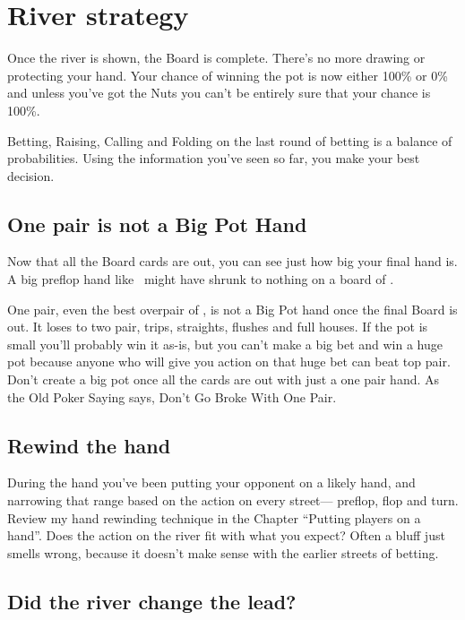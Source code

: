 \chapter{River strategy}


Once the river is shown, the Board is complete. There's no more
drawing or protecting your hand. Your chance of winning the pot
is now either 100\% or 0\% and unless you've got the Nuts you
can't be entirely sure that your chance is 100\%.

Betting, Raising, Calling and Folding on the last round of betting
is a balance of probabilities. Using the information you've seen
so far, you make your best decision.

\section{One pair is not a Big Pot Hand}

Now that all the Board cards are out, you can see just how big
your final hand is. A big preflop hand like \Ah\Kh\ might have
shrunk to nothing on a board of \Jc\eigh\fivec\ninec\tenc.

One pair, even the best overpair of \Ah\As, is not a Big Pot hand once
the final Board is out. It loses to two pair, trips, straights,
flushes and full houses. If the pot is small you'll probably win it
as-is, but you can't make a big bet and win a huge pot because anyone
who will give you action on that huge bet can beat top pair. Don't
create a big pot once all the cards are out with just a one pair
hand. As the Old Poker Saying says, Don't Go Broke With One Pair.

\section{Rewind the hand}

During the hand you've been putting your opponent on a likely
hand, and narrowing that range based on the action on every street---
preflop, flop and turn. Review my hand rewinding technique in the
Chapter ``Putting players on a hand''. Does the action on the river
fit with what you expect? Often a bluff just smells wrong, because
it doesn't make sense with the earlier streets of betting.

\section{Did the river change the lead?}

